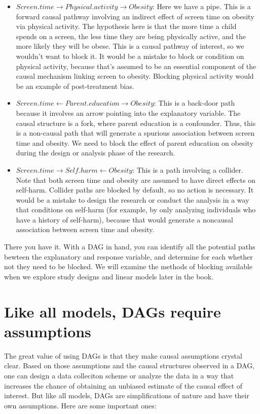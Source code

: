 \documentclass[
]{book}
\begin{document}
\begin{itemize}
\item
  \(Screen.time \to Physical.activity \to Obesity\): Here we have a pipe. This is a forward causal pathway involving an indirect effect of screen time on obesity via physical activity. The hypothesis here is that the more time a child spends on a screen, the less time they are being physically active, and the more likely they will be obese. This is a causal pathway of interest, so we wouldn't want to block it. It would be a mistake to block or condition on physical activity, because that's assumed to be an essential component of the causal mechanism linking screen to obesity. Blocking physical activity would be an example of post-treatment bias.
\item
  \(Screen.time \gets Parent.education \to Obesity\): This is a back-door path because it involves an arrow pointing into the explanatory variable. The causal structure is a fork, where parent education is a confounder. Thus, this is a non-causal path that will generate a spurious association between screen time and obesity. We need to block the effect of parent education on obesity during the design or analysis phase of the research.
\item
  \(Screen.time \to Self.harm \gets Obesity\): This is a path involving a collider. Note that both screen time and obesity are assumed to have direct effects on self-harm. Collider paths are blocked by default, so no action is necessary. It would be a mistake to design the research or conduct the analysis in a way that conditions on self-harm (for example, by only analyzing individuals who have a history of self-harm), because that would generate a noncausal association between screen time and obesity.
\end{itemize}

There you have it. With a DAG in hand, you can identify all the potential paths bewteen the explanatory and response variable, and determine for each whether not they need to be blocked. We will examine the methods of blocking available when we explore study designs and linear models later in the book.

\section{Like all models, DAGs require assumptions}\label{like-all-models-dags-require-assumptions}

The great value of using DAGs is that they make causal assumptions crystal clear. Based on those assumptions and the causal structures observed in a DAG, one can design a data colleciton scheme or analyze the data in a way that increases the chance of obtaining an unbiased estimate of the causal effect of interest. But like all models, DAGs are simplifications of nature and have their own assumptions. Here are some important ones:
\end{document}
